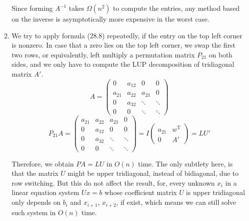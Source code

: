 \documentclass[a4paper,11pt]{article}
\begin{document}
\begin{enumerate}
      Since forming $A^{-1}$ takes $\Omega(n^2)$ to compute the entries, any method based on the inverse is asymptotically more expensive in the worst case.
    \item We try to apply formula (28.8) repeatedly, if the entry on the top left corner is nonzero. In case that a zero lies on the top left corner, we swap the first two rows, or equivalently, left multiply a permutation matrix $P_{21}$ on both sides, and we only have to compute the LUP decomposition of tridiagonal matrix $A'$.
        $$ A = \begin{pmatrix}
           0 & a_{12} & 0 & 0 \\
           a_{21} & a_{22} & a_{23} & 0 \\
           0 & a_{32} & \ddots & \ddots \\
           0 & 0 & \ddots & \ddots
         \end{pmatrix}$$
         $$ P_{21}A = \begin{pmatrix}
           a_{21} & a_{22} & a_{23} & 0 \\
           0 & a_{12} & 0 & 0 \\
           0 & a_{32} & \ddots & \ddots \\
           0 & 0 & \ddots & \ddots
         \end{pmatrix} = I
         \begin{pmatrix}
           a_{21} & w^{\text{T}} \\
           0 & A'
         \end{pmatrix} = LU'
         $$ \par
         Therefore, we obtain $PA = LU$ in $O(n)$ time. The only subtlety here, is that the matrix $U$ might be upper tridiagonal, instead of bidiagonal, due to row switching. But this do not affect the result, for, every unknown $x_i$ in a linear equation system  $Ux = b$ whose coefficient matrix $U$ is upper tridiagonal only depends on $b_i$ and $x_{i+1}$, $x_{i+2}$, if exist, which means we can still solve such system in $O(n)$ time.
  \end{enumerate}
\end{document}
